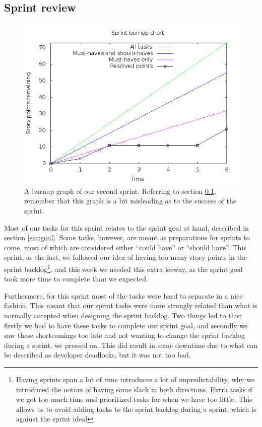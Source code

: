 \documentclass[a4paper]{article}
\begin{document}
\subsection{Sprint review}
\label{sec:review}
\begin{figure}
	\centering
	\includegraphics[width=\textwidth/2]{img/burndown.png}
	\caption{A burnup graph of our second sprint. Referring to section
	\ref{sec:review}, remember that this graph is a bit misleading as to the
	success of the sprint.}
	\label{fig:burnup}
\end{figure}

Most of our tasks for this sprint relates to the sprint goal at hand, described
in section \ref{sec:goal}. Some tasks, however, are meant as preparations for
sprints to come, most of which are considered either ``could have'' or ``should
have''. This sprint, as the last, we followed our idea of having too many story
points in the sprint backlog\footnote{Having sprints span a lot of time
introduces a lot of unpredictability, why we introduced the notion of having
some slack in both directions. Extra tasks if we got too much time and
prioritized tasks for when we have too little. This allows us to avoid adding
tasks to the sprint backlog during a sprint, which is against the sprint ideal}, and this week we needed this extra
leeway, as the sprint goal took more time to complete than we expected. 

Furthermore, for this sprint most of the tasks were hard to separate in a nice
fashion. This meant that our sprint tasks were more strongly related than
what is normally accepted when designing the sprint backlog. Two things led to
this; firstly we had to have these tasks to complete our sprint goal, and
secondly we saw these shortcomings too late and not wanting to change the sprint
backlog during a sprint, we pressed on. This did result in some downtime due to
what can be described as developer deadlocks, but it was not too bad.
\end{document}
